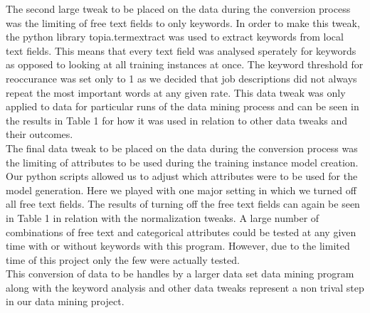 The second large tweak to be placed on the data during the conversion process was the limiting of free text fields to only 
keywords. In order to make this tweak, the python library topia.termextract was used to extract keywords from local text fields.
This means that every text field was analysed sperately for keywords as opposed to looking at all training instances at once.
The keyword threshold for reoccurance was set only to 1 as we decided that job descriptions did not always repeat the most important
words at any given rate. This data tweak was only applied to data for particular runs of the data mining process and can be seen
in the results in Table 1 for how it was used in relation to other data tweaks and their outcomes.\\

The final data tweak to be placed on the data during the conversion process was the limiting of attributes to be used during 
the training instance model creation. Our python scripts allowed us to adjust which attributes were to be used for the model
generation. Here we played with one major setting in which we turned off all free text fields. The results of turning off
the free text fields can again be seen in Table 1 in relation with the normalization tweaks. A large number of combinations
of free text and categorical attributes could be tested at any given time with or without keywords with this program. However,
due to the limited time of this project only the few were actually tested.\\

This conversion of data to be handles by a larger data set data mining program along with the keyword analysis and other
data tweaks represent a non trival step in our data mining project.